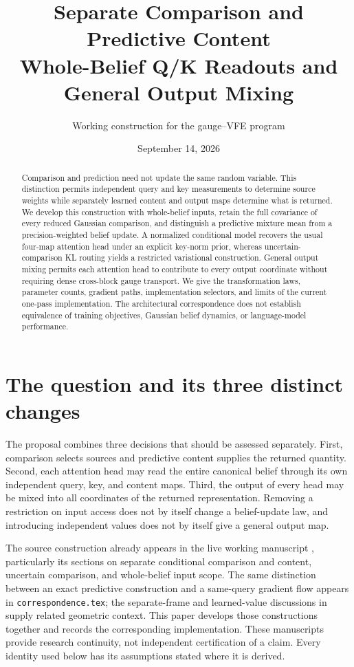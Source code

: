 \documentclass[11pt,letterpaper]{article}
\title{Separate Comparison and Predictive Content\\Whole-Belief Q/K Readouts and General Output Mixing}
\author{Working construction for the gauge--VFE program}
\date{September 14, 2026}
\begin{document}
\maketitle
\begin{abstract}
Comparison and prediction need not update the same random variable. This distinction permits independent query and key measurements to determine source weights while separately learned content and output maps determine what is returned. We develop this construction with whole-belief inputs, retain the full covariance of every reduced Gaussian comparison, and distinguish a predictive mixture mean from a precision-weighted belief update. A normalized conditional model recovers the usual four-map attention head under an explicit key-norm prior, whereas uncertain-comparison KL routing yields a restricted variational construction. General output mixing permits each attention head to contribute to every output coordinate without requiring dense cross-block gauge transport. We give the transformation laws, parameter counts, gradient paths, implementation selectors, and limits of the current one-pass implementation. The architectural correspondence does not establish equivalence of training objectives, Gaussian belief dynamics, or language-model performance.
\end{abstract}
\tableofcontents

\section{The question and its three distinct changes}
The proposal combines three decisions that should be assessed separately. First, comparison selects sources and predictive content supplies the returned quantity. Second, each attention head may read the entire canonical belief through its own independent query, key, and content maps. Third, the output of every head may be mixed into all coordinates of the returned representation. Removing a restriction on input access does not by itself change a belief-update law, and introducing independent values does not by itself give a general output map.

The source construction already appears in the live working manuscript , particularly its sections on separate conditional comparison and content, uncertain comparison, and whole-belief input scope. The same distinction between an exact predictive construction and a same-query gradient flow appears in \texttt{correspondence.tex}; the separate-frame and learned-value discussions in  supply related geometric context. This paper develops those constructions together and records the corresponding implementation. These manuscripts provide research continuity, not independent certification of a claim. Every identity used below has its assumptions stated where it is derived.
\end{document}

